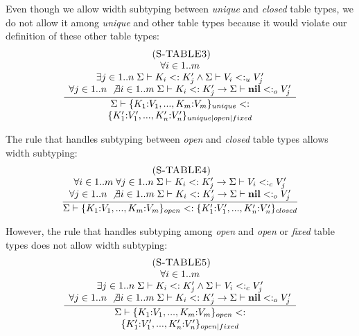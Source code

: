 \documentclass{sigplanconf}
\newcommand{\Nil}{\mathbf{nil}}
\newcommand{\mylabel}[1]{\; (\textsc{#1})}
\newcommand{\senv}{\Sigma}
\newcommand{\subtype}{<:}
\begin{document}
Even though we allow width subtyping between \emph{unique} and \emph{closed}
table types, we do not allow it among \emph{unique} and other table types
because it would violate our definition of these other table types:
\[
\begin{array}{c}
\mylabel{S-TABLE3}\\
\dfrac{\begin{array}{c}
       \forall i \in 1..m \\
       \exists j \in 1..n \;
       \senv \vdash K_{i} \subtype K_{j}' \land \senv \vdash V_{i} \subtype_{u} V_{j}' \\
       \forall j \in 1..n \; \not\exists i \in 1..m \;
       \senv \vdash K_{i} \subtype K_{j}' \to \senv \vdash \Nil \subtype_{o} V_{j}'
       \end{array}}
      {\begin{array}{c}
       \senv \vdash \{K_{1}{:}V_{1}, ..., K_{m}{:}V_{m}\}_{unique} \subtype\\
                    \{K_{1}'{:}V_{1}', ..., K_{n}'{:}V_{n}'\}_{unique|open|fixed}
       \end{array}}
\end{array}
\]

The rule that handles subtyping between \emph{open} and \emph{closed} table
types allows width subtyping:
\[
\begin{array}{c}
\mylabel{S-TABLE4}\\
\dfrac{\begin{array}{c}
       \forall i \in 1..m \; \forall j \in 1..n \;
       \senv \vdash K_{i} \subtype K_{j}' \to \senv \vdash V_{i} \subtype_{c} V_{j}' \\
       \forall j \in 1..n \; \not\exists i \in 1..m \;
       \senv \vdash K_{i} \subtype K_{j}' \to \senv \vdash \Nil \subtype_{o} V_{j}'
       \end{array}}
      {\senv \vdash \{K_{1}{:}V_{1}, ..., K_{m}{:}V_{m}\}_{open} \subtype
                    \{K_{1}'{:}V_{1}', ..., K_{n}'{:}V_{n}'\}_{closed}}
\end{array}
\]

However, the rule that handles subtyping among \emph{open} and
\emph{open} or \emph{fixed} table types does not allow width subtyping:
\[
\begin{array}{c}
\mylabel{S-TABLE5}\\
\dfrac{\begin{array}{c}
       \forall i \in 1..m \\
       \exists j \in 1..n \;
       \senv \vdash K_{i} \subtype K_{j}' \land \senv \vdash V_{i} \subtype_{c} V_{j}' \\
       \forall j \in 1..n \; \not\exists i \in 1..m \;
       \senv \vdash K_{i} \subtype K_{j}' \to \senv \vdash \Nil \subtype_{o} V_{j}'
       \end{array}}
      {\begin{array}{c}
       \senv \vdash \{K_{1}{:}V_{1}, ..., K_{m}{:}V_{m}\}_{open} \subtype\\
                    \{K_{1}'{:}V_{1}', ..., K_{n}'{:}V_{n}'\}_{open|fixed}
       \end{array}}
\end{array}
\]
\end{document}

